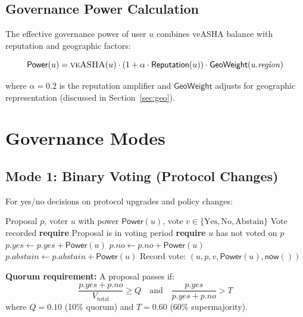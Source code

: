 \documentclass[11pt,a4paper]{article}
\newcommand{\veasha}{\textsc{veASHA}\xspace}
\begin{document}
\subsection{Governance Power Calculation}

The effective governance power of user $u$ combines veASHA balance with reputation and geographic factors:

\begin{equation}
    \mathsf{Power}(u) = \veasha(u) \cdot (1 + \alpha \cdot \mathsf{Reputation}(u)) \cdot \mathsf{GeoWeight}(u.\mathit{region})
\end{equation}

where $\alpha = 0.2$ is the reputation amplifier and $\mathsf{GeoWeight}$ adjusts for geographic representation (discussed in Section~\ref{sec:geo}).

\section{Governance Modes}

\subsection{Mode 1: Binary Voting (Protocol Changes)}

For yes/no decisions on protocol upgrades and policy changes:

\begin{algorithm}[H]
\caption{Binary Vote}
\label{alg:binary}
\begin{algorithmic}[1]
\Require Proposal $p$, voter $u$ with power $\mathsf{Power}(u)$, vote $v \in \{\text{Yes}, \text{No}, \text{Abstain}\}$
\Ensure Vote recorded
\State \textbf{require} Proposal is in voting period
\State \textbf{require} $u$ has not voted on $p$
    \State $p.\mathit{yes} \leftarrow p.\mathit{yes} + \mathsf{Power}(u)$
    \State $p.\mathit{no} \leftarrow p.\mathit{no} + \mathsf{Power}(u)$
\Else
    \State $p.\mathit{abstain} \leftarrow p.\mathit{abstain} + \mathsf{Power}(u)$
\EndIf
\State Record vote: $(u, p, v, \mathsf{Power}(u), \mathsf{now}())$
\end{algorithmic}
\end{algorithm}

\textbf{Quorum requirement:} A proposal passes if:
\begin{equation}
    \frac{p.\mathit{yes} + p.\mathit{no}}{V_{\text{total}}} \geq Q \quad \text{and} \quad \frac{p.\mathit{yes}}{p.\mathit{yes} + p.\mathit{no}} > T
\end{equation}
where $Q = 0.10$ (10\% quorum) and $T = 0.60$ (60\% supermajority).
\end{document}
